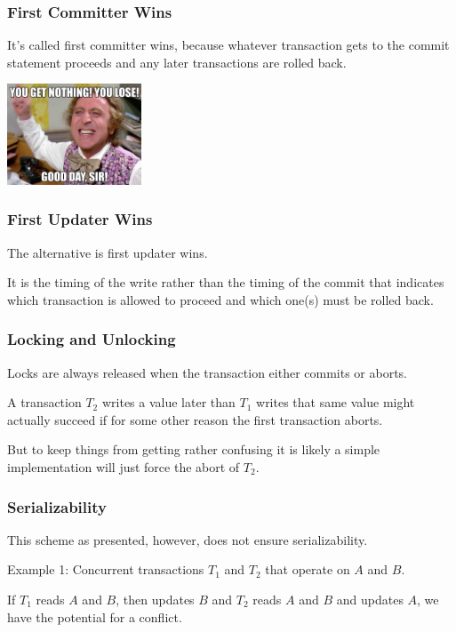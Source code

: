 \begin{frame}
\frametitle{First Committer Wins}

It's called first committer wins, because whatever transaction gets to the commit statement proceeds and any later transactions are rolled back.

\begin{center}
	\includegraphics[width=0.3\textwidth]{images/good-day-sir.jpg}
\end{center}

\end{frame}

\begin{frame}
\frametitle{First Updater Wins}

The alternative is \alert{first updater wins}.

It is the timing of the write rather than the timing of the commit that indicates which transaction is allowed to proceed and which one(s) must be rolled back.  


\end{frame}

\begin{frame}
\frametitle{Locking and Unlocking}
Locks are always released when the transaction either commits or aborts.

A transaction $T_{2}$ writes a value later than $T_{1}$ writes that same value might actually succeed if for some other reason the first transaction aborts. 

But to keep things from getting rather confusing it is likely a simple implementation will just force the abort of $T_{2}$.


\end{frame}


\begin{frame}
\frametitle{Serializability}
This scheme as presented, however, does not ensure serializability.


Example 1: Concurrent transactions $T_{1}$ and $T_{2}$ that operate on $A$ and $B$. 

If $T_{1}$ reads $A$ and $B$, then updates $B$ and $T_{2}$ reads $A$ and $B$ and updates $A$, we have the potential for a conflict. 


\end{frame}


